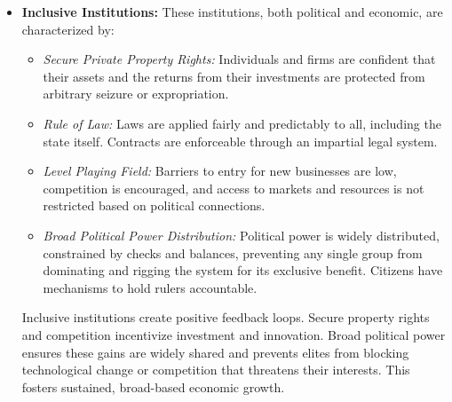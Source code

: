 \begin{itemize}
    \item \textbf{Inclusive Institutions:} These institutions, both political and economic, are characterized by:
          \begin{itemize}
              \item \textit{Secure Private Property Rights:} Individuals and firms are confident that their assets and the returns from their investments are protected from arbitrary seizure or expropriation.
              \item \textit{Rule of Law:} Laws are applied fairly and predictably to all, including the state itself. Contracts are enforceable through an impartial legal system.
              \item \textit{Level Playing Field:} Barriers to entry for new businesses are low, competition is encouraged, and access to markets and resources is not restricted based on political connections.
              \item \textit{Broad Political Power Distribution:} Political power is widely distributed, constrained by checks and balances, preventing any single group from dominating and rigging the system for its exclusive benefit. Citizens have mechanisms to hold rulers accountable.
          \end{itemize}
          Inclusive institutions create positive feedback loops. Secure property rights and competition incentivize investment and innovation. Broad political power ensures these gains are widely shared and prevents elites from blocking technological change or competition that threatens their interests. This fosters sustained, broad-based economic growth.


\end{itemize}
